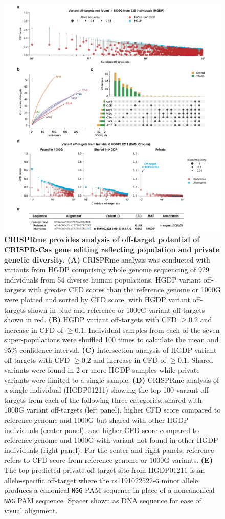 \documentclass[a4paper, titlepage, openright]{book}
\begin{document}
\begin{figure}
	\centering
	\includegraphics[width=\textwidth]{figures/crisprme4.png}
	\caption[CRISPRme provides analysis of off-target potential of CRISPR-Cas gene editing reflecting population and private genetic diversity]{\textbf{CRISPRme provides analysis of off-target potential of CRISPR-Cas gene editing reflecting population and private genetic diversity. (A)} CRISPRme analysis was conducted with variants from HGDP comprising whole genome sequencing of 929 individuals from 54 diverse human populations. HGDP variant off-targets with greater CFD scores than the reference genome or 1000G were plotted and sorted by CFD score, with HGDP variant off-targets shown in blue and reference or 1000G variant off-targets shown in red. \textbf{(B)} HGDP variant off-targets with CFD $\geq 0.2$ and increase in CFD of $\geq 0.1$. Individual samples from each of the seven super-populations were shuffled 100 times to calculate the mean and 95\% confidence interval. \textbf{(C)} Intersection analysis of HGDP variant off-targets with CFD $\geq 0.2$ and increase in CFD of $\geq 0.1$. Shared variants were found in 2 or more HGDP samples while private variants were limited to a single sample. \textbf{(D)} CRISPRme analysis of a single individual (HGDP01211) showing the top 100 variant off-targets from each of the following three categories: shared with 1000G variant off-targets (left panel), higher CFD score compared to reference genome and 1000G but shared with other HGDP individuals (center panel), and higher CFD score compared to reference genome and 1000G with variant not found in other HGDP individuals (right panel). For the center and right panels, reference refers to CFD score from reference genome or 1000G variants. \textbf{(E)} The top predicted private off-target site from HGDP01211 is an allele-specific off-target where the rs1191022522-\texttt{G} minor allele produces a canonical \texttt{NGG} PAM sequence in place of a noncanonical \texttt{NAG} PAM sequence. Spacer shown as DNA sequence for ease of visual alignment.}

\end{figure}
\end{document}
